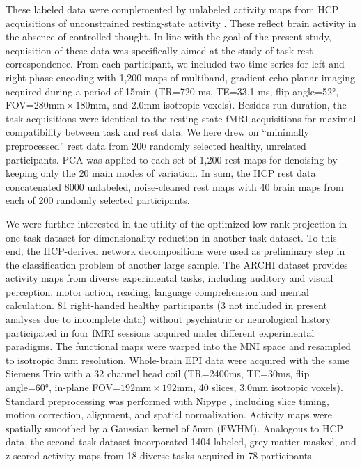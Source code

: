\documentclass{article} %
\begin{document}
These labeled data were complemented by unlabeled activity maps
from HCP acquisitions of unconstrained resting-state activity
\cite{smith2013resting}.
These reflect brain activity in the absence of controlled thought.
In line with the goal of the present study, acquisition of these data was
specifically aimed at the study of task-rest correspondence.
From each participant, we included two
time-series for left and right phase encoding
with 1,200 maps of multiband, gradient-echo planar imaging acquired
during a period of 15min (TR=720 ms, TE=33.1 ms, flip angle=52°,
FOV=$280\textrm{mm}\times180\textrm{mm}$, and 2.0mm isotropic voxels). 
Besides run duration,
the task acquisitions were identical to the resting-state fMRI acquisitions
for maximal compatibility between task and rest data.
We here drew on ``minimally preprocessed'' rest data
from 200 randomly selected healthy, unrelated participants.
PCA was applied to each set of 1,200 rest maps for
denoising by keeping only the 20 main modes of
variation.
In sum, the HCP rest data concatenated
8000 unlabeled, noise-cleaned rest maps with
40 brain maps from each of 200 randomly selected participants.

We were further interested in the utility of the
optimized low-rank projection
in one task dataset for dimensionality reduction in another task dataset.
To this end, the HCP-derived network decompositions were used as preliminary
step in the classification problem of another large sample.
The ARCHI dataset \cite{pinel07} provides activity maps from
diverse experimental tasks, including auditory and visual perception, motor action,
reading, language comprehension and mental calculation.
81 right-handed healthy participants
(3 not included in present analyses due to incomplete data)
without psychiatric or
neurological history participated in four fMRI sessions acquired under
different experimental paradigms.
The functional maps were warped into
the MNI space and resampled to isotropic 3mm resolution.
Whole-brain EPI data were acquired with the same Siemens Trio with a 32
channel head coil (TR=2400ms, TE=30ms, flip angle=60°, in-plane
FOV=$192\textrm{mm}\times192\textrm{mm}$, 40 slices, 3.0mm isotropic voxels).
Standard preprocessing was performed with Nipype \cite{gorgo11}, including
slice timing, motion correction, alignment, and spatial normalization.
Activity maps were spatially smoothed by
a Gaussian kernel of 5mm (FWHM).
Analogous to HCP data, the second task dataset incorporated 1404
labeled, grey-matter masked, and z-scored activity maps
from 18 diverse tasks acquired in 78 participants.
\end{document}
